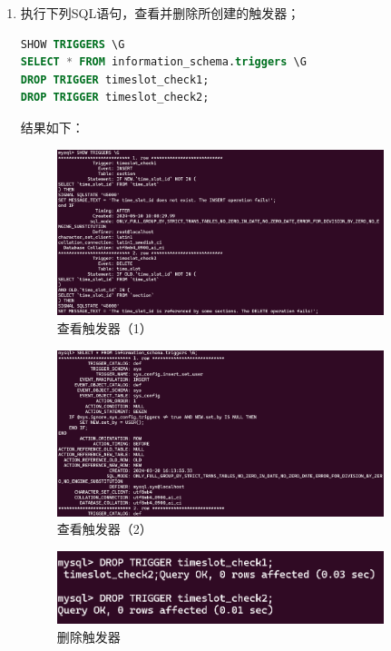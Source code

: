 \documentclass{article}
\begin{document}
\begin{enumerate}
\item 执行下列SQL语句，查看并删除所创建的触发器；

\begin{lstlisting}[language=sql]
SHOW TRIGGERS \G
SELECT * FROM information_schema.triggers \G
DROP TRIGGER timeslot_check1;
DROP TRIGGER timeslot_check2;
\end{lstlisting}

结果如下：

\begin{figure}[H]
  \centering
  \includegraphics[width=0.9\textwidth]{img/20.png}
  \caption{查看触发器（1）}
\end{figure}

\begin{figure}[H]
  \centering
  \includegraphics[width=0.9\textwidth]{img/21.png}
  \caption{查看触发器（2）}
\end{figure}

\begin{figure}[H]
  \centering
  \includegraphics[width=0.9\textwidth]{img/22.png}
  \caption{删除触发器}
\end{figure}


\end{enumerate}
\end{document}
